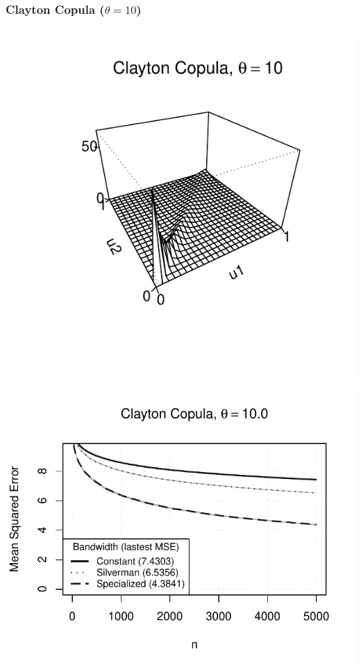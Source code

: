 \documentclass[aspectratio=169]{beamer}
\begin{document}
		\subsubsection{Clayton Copula ($ \theta = 10 $)}
			\begin{frame}
				\frametitle{\insertsubsubsection}
				
				\begin{flushleft}
					\includegraphics[width=0.4\linewidth]{plots/numerical_results/clayton10}
					\includegraphics[width=0.5\linewidth]{../text/plots/experiment_results/clayton10}
				\end{flushleft}
				
			\end{frame}
	
\end{document}
